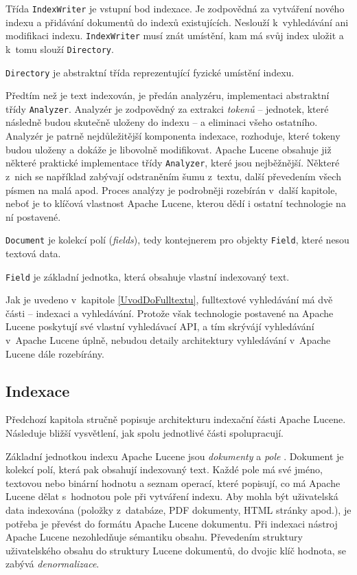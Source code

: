 \documentclass[11pt,oneside]{fithesis2}
\begin{document}
Třída \texttt{IndexWriter} je vstupní bod indexace. Je zodpovědná za vytváření nového indexu a přidávání dokumentů do indexů existujících. Neslouží k~vyhledávání ani modifikaci indexu. \texttt{IndexWriter} musí znát umístění, kam má svůj index uložit a k~tomu slouží \texttt{Directory}. 

\texttt{Directory} je abstraktní třída reprezentující fyzické umístění indexu.  

Předtím než je text indexován, je předán analyzéru, implementaci abstraktní třídy \texttt{Analyzer}. Analyzér je zodpovědný za extrakci \emph{tokenů} -- jednotek, které následně budou skutečně uloženy do indexu \cite[s.~116]{LuceneAction} -- a eliminaci všeho ostatního. Analyzér je patrně nejdůležitější komponenta indexace, rozhoduje, které tokeny budou uloženy a dokáže je libovolně modifikovat. Apache Lucene obsahuje již některé praktické implementace třídy \texttt{Analyzer}, které jsou nejběžnější. Některé z~nich  se například zabývají odstraněním šumu z~textu, další převedením všech písmen na malá apod. Proces analýzy je podrobněji rozebírán v~další kapitole, neboť je to klíčová vlastnost Apache Lucene, kterou dědí i ostatní technologie na ní postavené.

\texttt{Document} je kolekcí polí (\emph{fields}), tedy kontejnerem pro objekty \texttt{Field}, které nesou textová data. 

\texttt{Field} je základní jednotka, která obsahuje vlastní indexovaný text.

Jak je uvedeno v~kapitole \ref{UvodDoFulltextu}, fulltextové vyhledávání má dvě části -- indexaci a vyhledávání. Protože však technologie postavené na Apache Lucene poskytují své vlastní vyhledávací API, a tím skrývájí vyhledávání v~Apache Lucene úplně, nebudou detaily architektury vyhledávání v~Apache Lucene dále rozebírány. 

\subsection{Indexace}
Předchozí kapitola stručně popisuje architekturu indexační části Apache Lucene. Následuje bližší vysvětlení, jak spolu jednotlivé části spolupracují.

Základní jednotkou indexu Apache Lucene jsou \emph{dokumenty} a \emph{pole} \cite[s.~32]{LuceneAction}. Dokument je kolekcí polí, která pak obsahují indexovaný text. Každé pole má své jméno, textovou nebo binární hodnotu a seznam operací, které popisují, co má Apache Lucene dělat s~hodnotou pole při vytváření indexu. Aby mohla být uživatelská data indexována (položky z~databáze, PDF dokumenty, HTML stránky apod.), je potřeba je převést do formátu Apache Lucene dokumentu. Při indexaci nástroj Apache Lucene nezohledňuje sémantiku obsahu. Převedením struktury uživatelského obsahu do struktury Lucene dokumentů, do dvojic klíč hodnota, se zabývá \emph{denormalizace}.
\end{document}
